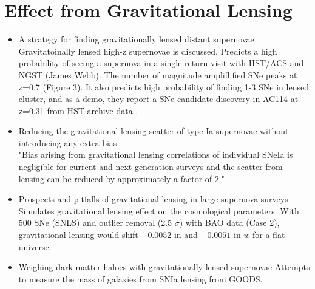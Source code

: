 \section{Effect from Gravitational Lensing}
\begin{itemize}
\item A strategy for finding gravitationally lensed distant supernovae
\citep[][sullivan00a]{sullivan00a}\\
Gravitatoinally lensed high-z supernovae is discussed.
Predicts a high probability of seeing a supernova in a single
return visit with HST/ACS and NGST (James Webb).
The number of magnitude ampliflified SNe peaks at z=0.7 (Figure 3).
It also predicts high probability of finding 1-3 SNe in lensed cluster,
and as a demo, they report a SNe candidate discovery in AC114 at z=0.31
from HST archive data .

\item Reducing the gravitational lensing scatter of type Ia supernovae without introducing any extra bias
\citet[][\#2 4/26/10, jonsson09a]{jonsson09a}\\
"Bias arising from gravitational lensing correlations of individual SNeIa is negligible
for current and next generation surveys and the scatter from lensing can be reduced by approximately
a factor of 2."

\item Prospects and pitfalls of gravitational lensing in large supernova surveys
\citet[][\#6 4/26/10, jonsson08a]{jonsson08a}\\ 
Simulates gravitational lensing effect on the cosmological parameters.
With 500 SNe (SNLS) and outlier removal (2.5 $\sigma$) with BAO data (Case 2),
gravitational lensing would shift $-0.0052$ in \omegam and $-0.0051$ in
$w$ for a flat universe. 

\item  Weighing dark matter haloes with gravitationally lensed supernovae \citep{jonsson10a}
Attempts to measure the mass of galaxies from SNIa lensing from GOODS.

\end{itemize}
